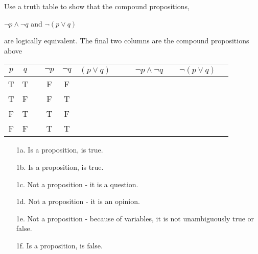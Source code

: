 {    
    \begin{questionNOGRADE}{\thequestion}
        Use a truth table to show that the compound propositions,

        \begin{center}
        $ \neg p \land \neg q $
        \tab and \tab
        $ \neg ( p \lor q ) $
        \end{center}
        are logically equivalent. The final two columns are
        the compound propositions above
        ~\\
        \begin{center}
            \begin{tabular}{ | c | c | c | c | c | c  c | c | c | c | c | c | }
                \hline
                $p$ &
                $q$ & &

                $\neg p$ &
                $\neg q$ &

                $(p \lor q)$ & & &

                $ \neg p \land \neg q $ & &
                $ \neg ( p \lor q ) $
                \\ \hline

                T & T & & F & F & & & & & & \\ \hline
                T & F & & F & T & & & & & & \\ \hline
                F & T & & T & F & & & & & & \\ \hline
                F & F & & T & T & & & & & & \\ \hline
            \end{tabular} 
        \end{center}       
    \end{questionNOGRADE}




}{

    \begin{enumerate}
        \item[1a.]  Is a proposition, is true.
        \item[1b.]  Is a proposition, is true.
        \item[1c.]  Not a proposition - it is a question.
        \item[1d.]  Not a proposition - it is an opinion.
        \item[1e.]  Not a proposition - because of variables, it is not unambiguously true or false.
        \item[1f.]  Is a proposition, is false.


\end{enumerate}}
